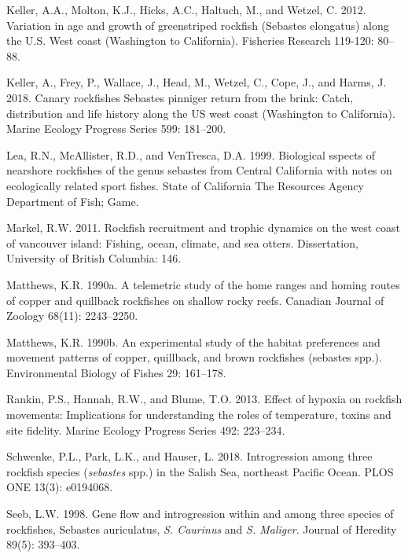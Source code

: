 \documentclass[11pt,
  english,
  letterpaper,
]{article}
\begin{document}
\leavevmode\hypertarget{ref-keller_variation_2012}{}%
Keller, A.A., Molton, K.J., Hicks, A.C., Haltuch, M., and Wetzel, C. 2012. Variation in age and growth of greenstriped rockfish (Sebastes elongatus) along the U.S. West coast (Washington to California). Fisheries Research 119-120: 80--88.

\leavevmode\hypertarget{ref-keller_canary_2018}{}%
Keller, A., Frey, P., Wallace, J., Head, M., Wetzel, C., Cope, J., and Harms, J. 2018. Canary rockfishes Sebastes pinniger return from the brink: Catch, distribution and life history along the US west coast (Washington to California). Marine Ecology Progress Series 599: 181--200.

\leavevmode\hypertarget{ref-lea_biological_1999}{}%
Lea, R.N., McAllister, R.D., and VenTresca, D.A. 1999. Biological sspects of nearshore rockfishes of the genus sebastes from Central California with notes on ecologically related sport fishes. State of California The Resources Agency Department of Fish; Game.

\leavevmode\hypertarget{ref-markel_rockfish_2011}{}%
Markel, R.W. 2011. Rockfish recruitment and trophic dynamics on the west coast of vancouver island: Fishing, ocean, climate, and sea otters. Dissertation, University of British Columbia: 146.

\leavevmode\hypertarget{ref-matthews_telemetry_1990}{}%
Matthews, K.R. 1990a. A telemetric study of the home ranges and homing routes of copper and quillback rockfishes on shallow rocky reefs. Canadian Journal of Zoology 68(11): 2243--2250.

\leavevmode\hypertarget{ref-matthews_seasonal_home_range_1990}{}%
Matthews, K.R. 1990b. An experimental study of the habitat preferences and movement patterns of copper, quillback, and brown rockfishes (sebastes spp.). Environmental Biology of Fishes 29: 161--178.

\leavevmode\hypertarget{ref-Rankinetal_hypoxia_and_fidelity_2013}{}%
Rankin, P.S., Hannah, R.W., and Blume, T.O. 2013. Effect of hypoxia on rockfish movements: Implications for understanding the roles of temperature, toxins and site fidelity. Marine Ecology Progress Series 492: 223--234.

\leavevmode\hypertarget{ref-schwenke_introgression_2018}{}%
Schwenke, P.L., Park, L.K., and Hauser, L. 2018. Introgression among three rockfish species (\emph{sebastes} spp.) in the Salish Sea, northeast Pacific Ocean. PLOS ONE 13(3): e0194068.

\leavevmode\hypertarget{ref-seeb_gene_1998}{}%
Seeb, L.W. 1998. Gene flow and introgression within and among three species of rockfishes, Sebastes auriculatus, \emph{S. Caurinus} and \emph{S. Maliger}. Journal of Heredity 89(5): 393--403.
\end{document}

